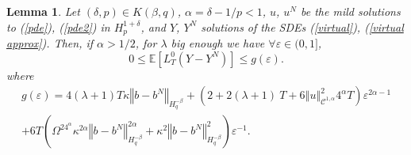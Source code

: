 \documentclass[11pt]{article}
\newtheorem{lem}[theo]{Lemma}
\newcommand{\norme}[1]{\left\Vert #1\right\Vert}
\newcommand{\E}{\mathbb{E}}
\begin{document}
\begin{lem}\label{local time}
    Let $(\delta,p)\in K(\beta,q)$, $\alpha=\delta-1/p<1$, $u$, $u^N$ be the mild solutions to (\ref{pde}), (\ref{pde2}) in $H_p^{1+\delta}$, and $Y$, $Y^N$ solutions of the SDEs (\ref{virtual}), (\ref{virtual approx}).  Then, if $\alpha>1/2$, for $\lambda$ big enough we have $\forall\varepsilon\in(0,1]$,
    \begin{equation}
    0\leq \E\left[L^0_T(Y-Y^N)\right]\leq  g(\varepsilon).
    \end{equation}
    where \begin{multline}
    g(\varepsilon) = 4(\lambda + 1)T\kappa\norme{b-b^N}_{H^{-\beta}_{q}} + \left(2 + 2(\lambda + 1)\ T + 6\norme{u}_{\mathcal{C}^{1,\alpha}}^2 4^{\alpha}T\right) \varepsilon^{2\alpha-1} \\ + 6T\left(\Omega^24^{\alpha}\kappa^{2\alpha} \norme{b-b^N}_{H^{-\beta}_q}^{2\alpha}+\kappa^2\norme{b-b^N}_{H^{-\beta}_{q}}^2\right)\varepsilon^{-1}.
    \end{multline}
    
\end{lem}
\end{document}
